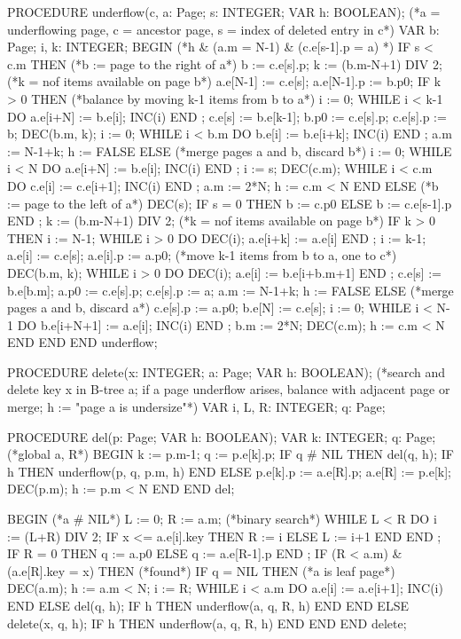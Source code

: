 PROCEDURE underflow(c, a: Page; s: INTEGER; VAR h: BOOLEAN);
  (*a = underflowing page, c = ancestor page,
   s = index of deleted entry in c*)
  VAR b: Page;
      i, k: INTEGER;
BEGIN (*h & (a.m = N-1) & (c.e[s-1].p = a) *)
  IF s < c.m THEN (*b := page to the right of a*)
    b := c.e[s].p; k := (b.m-N+1) DIV 2; (*k = nof items available on page b*)
    a.e[N-1] := c.e[s]; a.e[N-1].p := b.p0;
    IF k > 0 THEN (*balance by moving k-1 items from b to a*) i := 0;
      WHILE i < k-1 DO a.e[i+N] := b.e[i]; INC(i) END ;
      c.e[s] := b.e[k-1]; b.p0 := c.e[s].p;
      c.e[s].p := b; DEC(b.m, k); i := 0;
      WHILE i < b.m DO b.e[i] := b.e[i+k]; INC(i) END ;
      a.m := N-1+k; h := FALSE
    ELSE (*merge pages a and b, discard b*) i := 0;
      WHILE i < N DO a.e[i+N] := b.e[i]; INC(i) END ;
      i := s; DEC(c.m);
      WHILE i < c.m DO c.e[i] := c.e[i+1]; INC(i) END ;
      a.m := 2*N; h := c.m < N
      END
    ELSE (*b := page to the left of a*) DEC(s);
      IF s = 0 THEN b := c.p0 ELSE b := c.e[s-1].p END ;
      k := (b.m-N+1) DIV 2; (*k = nof items available on page b*) IF k > 0 THEN i := N-1;
      WHILE i > 0 DO DEC(i); a.e[i+k] := a.e[i] END ;
      i := k-1; a.e[i] := c.e[s]; a.e[i].p := a.p0;
      (*move k-1 items from b to a, one to c*) DEC(b.m, k);
      WHILE i > 0 DO DEC(i); a.e[i] := b.e[i+b.m+1] END ;
      c.e[s] := b.e[b.m]; a.p0 := c.e[s].p;
      c.e[s].p := a; a.m := N-1+k; h := FALSE ELSE (*merge pages a and b, discard a*)
      c.e[s].p := a.p0; b.e[N] := c.e[s]; i := 0;
      WHILE i < N-1 DO b.e[i+N+1] := a.e[i]; INC(i) END ;
      b.m := 2*N; DEC(c.m); h := c.m < N
    END
  END
END underflow;

PROCEDURE delete(x: INTEGER; a: Page; VAR h: BOOLEAN);
  (*search and delete key x in B-tree a; if a page underflow arises,
   balance with adjacent page or merge; h := "page a is undersize"*)
  VAR i, L, R: INTEGER; q: Page;
   
  PROCEDURE del(p: Page; VAR h: BOOLEAN);
  VAR k: INTEGER; q: Page; (*global a, R*)
  BEGIN k := p.m-1; q := p.e[k].p;
    IF q # NIL THEN del(q, h);
      IF h THEN underflow(p, q, p.m, h) END
    ELSE p.e[k].p := a.e[R].p; a.e[R] := p.e[k];
      DEC(p.m); h := p.m < N
    END
  END del;

BEGIN (*a # NIL*)
  L := 0; R := a.m; (*binary search*)
  WHILE L < R DO
    i := (L+R) DIV 2;
    IF x <= a.e[i].key THEN R := i ELSE L := i+1 END
  END ;
  IF R = 0 THEN q := a.p0 ELSE q := a.e[R-1].p END ;
  IF (R < a.m) & (a.e[R].key = x) THEN (*found*)
    IF q = NIL THEN (*a is leaf page*)
      DEC(a.m); h := a.m < N; i := R;
      WHILE i < a.m DO a.e[i] := a.e[i+1]; INC(i) END
    ELSE del(q, h);
      IF h THEN underflow(a, q, R, h) END
    END
  ELSE delete(x, q, h);
    IF h THEN underflow(a, q, R, h) END
  END
END delete;

